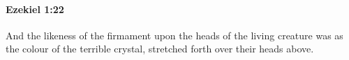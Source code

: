 
		\paragraph{Ezekiel 1:22} %
			\label{EZEKIEL-1-22}

			And the likeness of the firmament upon the heads of the living creature was as the colour of the terrible crystal, stretched forth over their heads above.


